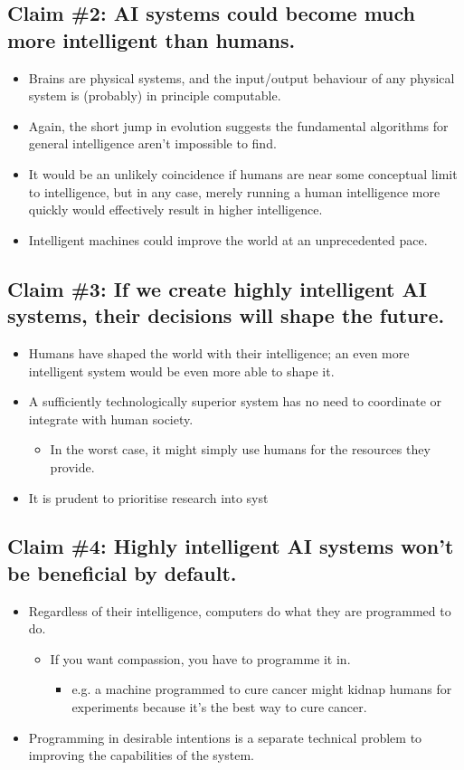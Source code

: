 \documentclass{article}
\begin{document}
\begin{multicols}{2}
\subsection{Claim \#2: AI systems could become much more intelligent than humans.}
\begin{itemize}
\item Brains are physical systems, and the input/output behaviour of any physical system is (probably) in principle computable.
\item Again, the short jump in evolution suggests the fundamental algorithms for general intelligence aren't impossible to find.
\item It would be an unlikely coincidence if humans are near some conceptual limit to intelligence, but in any case, merely running a human intelligence more quickly would effectively result in higher intelligence.
\item Intelligent machines could improve the world at an unprecedented pace.
\end{itemize}

\subsection{Claim \#3: If we create highly intelligent AI systems, their decisions will shape the future.}
\begin{itemize}
\item Humans have shaped the world with their intelligence; an even more intelligent system would be even more able to shape it.
\item A sufficiently technologically superior system has no need to coordinate or integrate with human society.
\begin{itemize}
\item In the worst case, it might simply use humans for the resources they provide.
\end{itemize}
\item It is prudent to prioritise research into syst
\end{itemize}

\subsection{Claim \#4: Highly intelligent AI systems won’t be beneficial by default.}
\begin{itemize}
\item Regardless of their intelligence, computers do what they are programmed to do.
\begin{itemize}
\item If you want compassion, you have to programme it in.
\begin{itemize}
\item e.g. a machine programmed to cure cancer might kidnap humans for experiments because it's the best way to cure cancer.
\end{itemize}
\end{itemize}
\item Programming in desirable intentions is a separate technical problem to improving the capabilities of the system.
\end{itemize}


\end{multicols}
\end{document}
